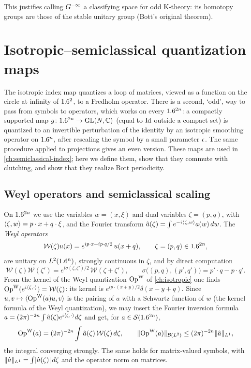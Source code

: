 This justifies calling $G^{-\infty}$ a classifying space for odd K-theory: its homotopy groups are
those of the stable unitary group (Bott's original theorem).

\section{Isotropic--semiclassical quantization maps}\label{bott:sec:quantization}

The isotropic index map quantizes a loop of matrices, viewed as a function on the
circle at infinity of $1.6^2$, to a Fredholm operator. There is a second, `odd', way to
pass from symbols to operators, which works on every $1.6^{2n}$: a compactly supported
map $g\colon1.6^{2n}\to\operatorname{GL}(N,\mathbb{C})$ (equal to $\operatorname{Id}$ outside a compact set) is quantized to
an invertible perturbation of the identity by an isotropic smoothing operator on
$1.6^n$, after rescaling the symbol by a small parameter $\epsilon$. The same procedure
applied to projections gives an even version. These maps are used in
\cref{ch:semiclassical-index}; here we define them, show that they commute with
clutching, and show that they realize Bott periodicity.

\subsection{Weyl operators and semiclassical scaling}
On $1.6^{2n}$ we use the variables $w=(x,\xi)$ and dual variables $\zeta=(p,q)$, with
$\langle \zeta, w\rangle=p\cdot x+q\cdot\xi$, and the Fourier transform
$\hat a(\zeta)=\int e^{-i\langle \zeta, w\rangle}a(w)\,dw$. The \emph{Weyl operators}
\begin{equation*}
  \mathcal W(\zeta)u(x)=e^{ip\cdot x+ip\cdot q/2}\,u(x+q),\qquad\zeta=(p,q)\in1.6^{2n},
\end{equation*}
are unitary on $L^2(1.6^n)$, strongly continuous in $\zeta$, and by direct computation
\begin{equation}\label{bott:eq:weyl-ops}
  \mathcal W(\zeta)\mathcal W(\zeta')=e^{i\sigma(\zeta,\zeta')/2}\,\mathcal W(\zeta+\zeta'),\qquad
  \sigma\bigl((p,q),(p',q')\bigr)=p'\cdot q-p\cdot q'.
\end{equation}
From the kernel of the Weyl quantization $\operatorname{Op}^{\mathrm{W}}$ of \cref{ch:isotropic} one finds
$\operatorname{Op}^{\mathrm{W}}(e^{i\langle \zeta, \cdot\rangle})=\mathcal W(\zeta)$: its kernel is
$e^{ip\cdot(x+y)/2}\delta(x-y+q)$. Since $u,v\mapsto\langle \operatorname{Op}^{\mathrm{W}}(a)u, v\rangle$ is the pairing of
$a$ with a Schwartz function of $w$ (the kernel formula of the Weyl quantization), we
may insert the Fourier inversion formula $a=(2\pi)^{-2n}\int\hat a(\zeta)e^{i\langle \zeta, \cdot\rangle}d\zeta$
and get, for $a\in\mathcal{S}(1.6^{2n})$,
\begin{equation}\label{bott:eq:weyl-superposition}
  \operatorname{Op}^{\mathrm{W}}(a)=(2\pi)^{-2n}\int\hat a(\zeta)\,\mathcal W(\zeta)\,d\zeta,\qquad
  \lVert \operatorname{Op}^{\mathrm{W}}(a)\rVert_{\mathcal{B}(L^2)}\le(2\pi)^{-2n}\lVert \hat a\rVert_{L^1},
\end{equation}
the integral converging strongly. The same holds for matrix-valued symbols, with
$\lVert \hat a\rVert_{L^1}=\int\lvert \hat a(\zeta)\rvert\,d\zeta$ and the operator norm on matrices.

